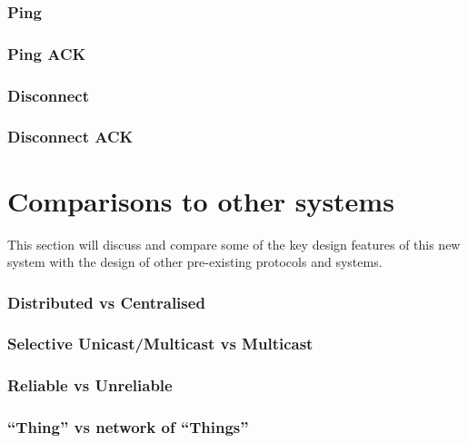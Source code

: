 \subsubsection{Ping} %
\label{ssub:ping}


\subsubsection{Ping ACK} %
\label{ssub:ping_ack}


\subsubsection{Disconnect} %
\label{ssub:disconnect}


\subsubsection{Disconnect ACK} %
\label{ssub:disconnect_ack}






\section{Comparisons to other systems}
This section will discuss and compare some of the key design features of this new system with the design of other pre-existing protocols and systems. 

\subsubsection{Distributed vs Centralised} %
\label{ssub:distributed_vs_centralised}

\subsubsection{Selective Unicast/Multicast vs Multicast} %
\label{ssub:selective_unicast_multicast_vs_multicast}

\subsubsection{Reliable vs Unreliable} %
\label{ssub:reliable_vs_unreliable}

\subsubsection{``Thing'' vs network of ``Things''} %
\label{ssub:_thing_vs_network_of_things_}

